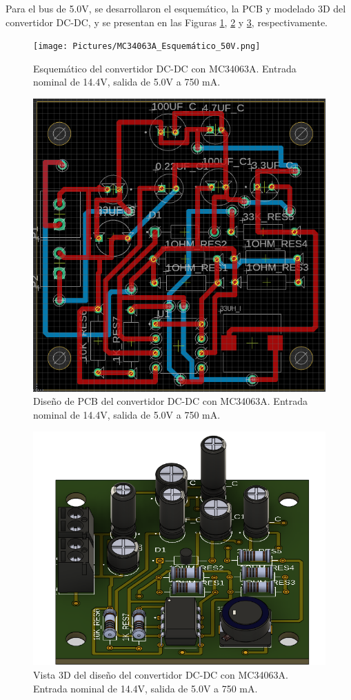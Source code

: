 Para el bus de 5.0V, se desarrollaron el esquemático, la PCB y modelado 3D del convertidor DC-DC, y se presentan en las Figuras \ref{fig:MC34063A_Esquemático_50V}, \ref{fig:MC34063A_PCB_50V} y \ref{fig:MC34063A_3D_50V}, respectivamente.






\begin{figure}[h]
  \centering
  \texttt{[image: Pictures/MC34063A\_Esquemático\_50V.png]} 
  \caption{Esquemático del convertidor DC-DC con MC34063A. Entrada nominal de 14.4V, salida de 5.0V a 750 mA.}
  \label{fig:MC34063A_Esquemático_50V}
\end{figure}

\newpage

\begin{figure}[h]
  \centering
  \includegraphics[width=0.55\linewidth]{Pictures/MC34063A_PCB_50V.png} 
  \caption{Diseño de PCB del convertidor DC-DC con MC34063A. Entrada nominal de 14.4V, salida de 5.0V a 750 mA.}
  \label{fig:MC34063A_PCB_50V}
\end{figure}

\begin{figure}[h]
  \centering
  \includegraphics[width=0.75\linewidth]{Pictures/MC34063A_3D_50V.png} 
  \caption{Vista 3D del diseño del convertidor DC-DC con MC34063A. Entrada nominal de 14.4V, salida de 5.0V a 750 mA.}
  \label{fig:MC34063A_3D_50V}
\end{figure}

